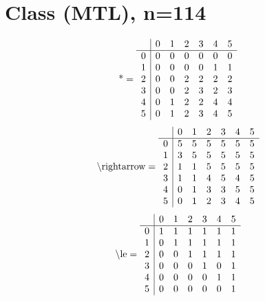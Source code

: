 \documentclass[11pt]{article}
\begin{document}
\section{Class (MTL), n=114}
\[\text{*} = 
\begin{array}{r | r r r r r r}
 & 0 & 1 & 2 & 3 & 4 & 5 \\ \hline
0 & 0 & 0 & 0 & 0 & 0 & 0 \\
1 & 0 & 0 & 0 & 0 & 1 & 1 \\
2 & 0 & 0 & 2 & 2 & 2 & 2 \\
3 & 0 & 0 & 2 & 3 & 2 & 3 \\
4 & 0 & 1 & 2 & 2 & 4 & 4 \\
5 & 0 & 1 & 2 & 3 & 4 & 5 \\
\end{array}
\]
\[\text{\textbackslash rightarrow} = 
\begin{array}{r | r r r r r r}
 & 0 & 1 & 2 & 3 & 4 & 5 \\ \hline
0 & 5 & 5 & 5 & 5 & 5 & 5 \\
1 & 3 & 5 & 5 & 5 & 5 & 5 \\
2 & 1 & 1 & 5 & 5 & 5 & 5 \\
3 & 1 & 1 & 4 & 5 & 4 & 5 \\
4 & 0 & 1 & 3 & 3 & 5 & 5 \\
5 & 0 & 1 & 2 & 3 & 4 & 5 \\
\end{array}
\]
\[\text{\textbackslash le} = 
\begin{array}{r | r r r r r r}
 & 0 & 1 & 2 & 3 & 4 & 5 \\ \hline
0 & 1 & 1 & 1 & 1 & 1 & 1 \\
1 & 0 & 1 & 1 & 1 & 1 & 1 \\
2 & 0 & 0 & 1 & 1 & 1 & 1 \\
3 & 0 & 0 & 0 & 1 & 0 & 1 \\
4 & 0 & 0 & 0 & 0 & 1 & 1 \\
5 & 0 & 0 & 0 & 0 & 0 & 1 \\
\end{array}
\]
\end{document}
